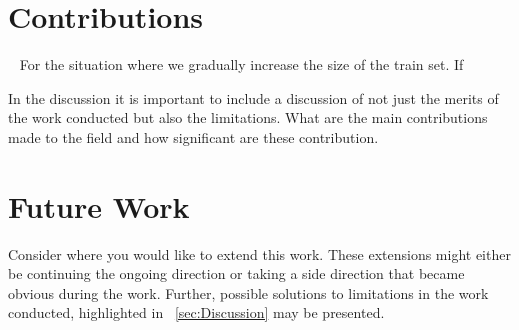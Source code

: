 \section{Contributions}~\label{cont}
\label{sec:Contributions}
For the situation where we gradually increase the size of the train set. If 

In the discussion it is important to include a discussion of not just the merits of the work conducted but also the limitations. 
What are the main contributions made to the field and how significant are these contribution.  

\section{Future Work}
\label{sec:futureWork}

Consider where you would like to extend this work. These extensions might either be continuing the ongoing direction or taking a side direction that became obvious during the work. Further, possible solutions to limitations in the work conducted, highlighted in ~\ref{sec:Discussion} may be presented. 
